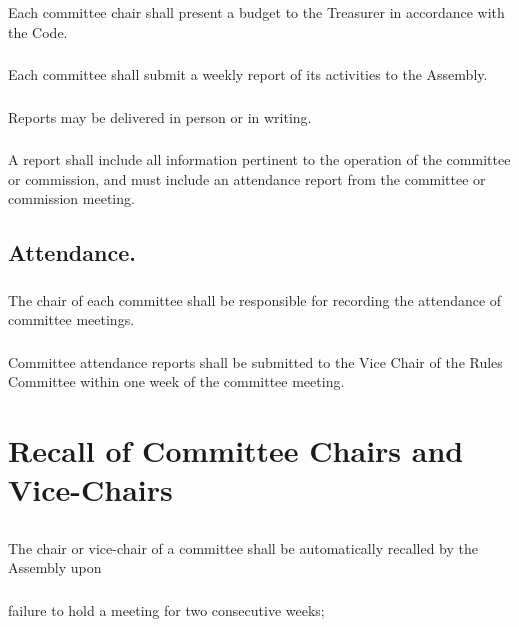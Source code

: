 \documentclass{rules}
\begin{document}
\subsubsection{}
Each committee chair shall present a budget to the Treasurer in accordance with the Code.
\subsubsection{}
Each committee shall submit a weekly report of its activities to the Assembly. 
\subsubsection{}
Reports may be delivered in person or in writing.
\subsubsection{}
A report shall include all information pertinent to the operation of the committee or commission, and must include an attendance report from the committee or commission meeting.
\subsection{Attendance.}
\subsubsection{}
The chair of each committee shall be responsible for recording the attendance of committee meetings. 
\subsubsection{}
Committee attendance reports shall be submitted to the Vice Chair of the Rules Committee within one week of the committee meeting.

\section{Recall of Committee Chairs and Vice-Chairs}
\subsection{}
The chair or vice-chair of a committee shall be automatically recalled by the Assembly upon
\subsubsection{}
failure to hold a meeting for two consecutive weeks;
\end{document}
